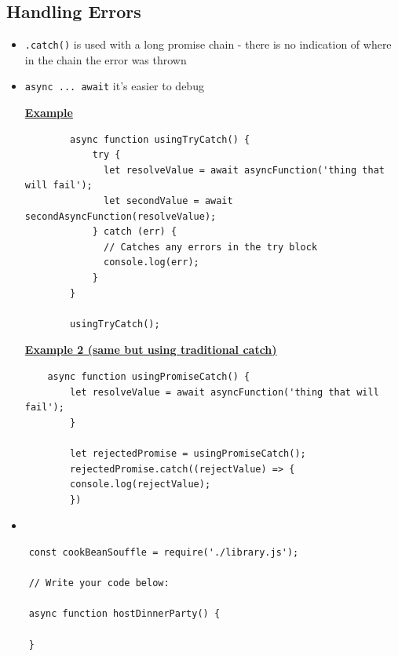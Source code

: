 \documentclass[12pt]{article}
\begin{document}
\subsection{Handling Errors}
\begin{itemize}
    \item \texttt{.catch()} is used with a long promise chain - there is no
    indication of where in the chain the error was thrown
    \item \texttt{async ... await} it's easier to debug

    \underline{\textbf{Example}}

    \begin{lstlisting}
        async function usingTryCatch() {
            try {
              let resolveValue = await asyncFunction('thing that will fail');
              let secondValue = await secondAsyncFunction(resolveValue);
            } catch (err) {
              // Catches any errors in the try block
              console.log(err);
            }
        }

        usingTryCatch();
    \end{lstlisting}

    \underline{\textbf{Example 2 (same but using traditional catch)}}


    \begin{lstlisting}
    async function usingPromiseCatch() {
        let resolveValue = await asyncFunction('thing that will fail');
        }

        let rejectedPromise = usingPromiseCatch();
        rejectedPromise.catch((rejectValue) => {
        console.log(rejectValue);
        })
    \end{lstlisting}

    \item
\end{itemize}

\begin{lstlisting}
    const cookBeanSouffle = require('./library.js');

    // Write your code below:

    async function hostDinnerParty() {

    }

\end{lstlisting}
\end{document}

